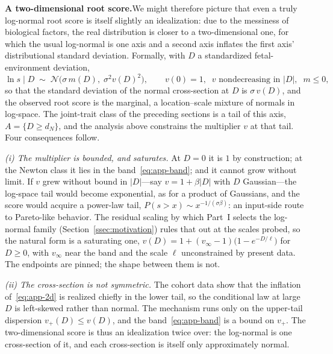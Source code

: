 \documentclass{article}
\begin{document}
\par\medskip\noindent\textbf{A two-dimensional root score.}\enspace We might therefore picture that even a truly log-normal root score is itself slightly an idealization: due to the messiness of biological factors, the real distribution is closer to a two-dimensional one, for which the usual log-normal is one axis and a second axis inflates the first axis' distributional standard deviation. Formally, with $D$ a standardized fetal-environment deviation,
\begin{equation}\label{eq:app-2d}
  \ln s \mid D \;\sim\; \mathcal{N}\bigl(\sigma\, m(D),\; \sigma^{2} v(D)^{2}\bigr), \qquad v(0) = 1,\;\; v \text{ nondecreasing in } |D|,\;\; m \leq 0,
\end{equation}
so that the standard deviation of the normal cross-section at $D$ is $\sigma\,v(D)$, and the observed root score is the marginal, a location--scale mixture of normals in log-space. The joint-trait class of the preceding sections is a tail of this axis, $A = \{D \geq d_N\}$, and the analysis above constrains the multiplier $v$ at that tail. Four consequences follow.

\emph{(i) The multiplier is bounded, and saturates.} At $D = 0$ it is $1$ by construction; at the Newton class it lies in the band~\eqref{eq:app-band}; and it cannot grow without limit. If $v$ grew without bound in $|D|$---say $v = 1 + \beta|D|$ with $D$ Gaussian---the log-space tail would become exponential, as for a product of Gaussians, and the score would acquire a power-law tail, $P(s > x) \sim x^{-1/(\sigma\beta)}$: an input-side route to Pareto-like behavior. The residual scaling by which Part~I selects the log-normal family (Section~\ref{ssec:motivation}) rules that out at the scales probed, so the natural form is a saturating one, $v(D) = 1 + (v_{\infty} - 1)\bigl(1 - e^{-D/\ell}\bigr)$ for $D \geq 0$, with $v_{\infty}$ near the band and the scale $\ell$ unconstrained by present data. The endpoints are pinned; the shape between them is not.

\emph{(ii) The cross-section is not symmetric.} The cohort data show that the inflation of~\eqref{eq:app-2d} is realized chiefly in the lower tail, so the conditional law at large $D$ is left-skewed rather than normal. The mechanism runs only on the upper-tail dispersion $v_{+}(D) \leq v(D)$, and the band~\eqref{eq:app-band} is a bound on $v_{+}$. The two-dimensional score is thus an idealization twice over: the log-normal is one cross-section of it, and each cross-section is itself only approximately normal.
\end{document}
